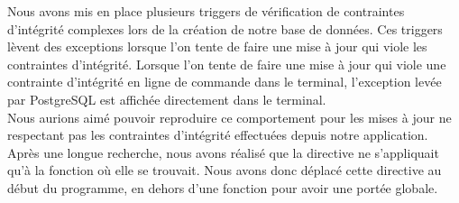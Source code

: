 Nous avons mis en place plusieurs triggers de vérification de contraintes d'intégrité complexes lors de la création de notre base de données. Ces triggers lèvent des exceptions lorsque l'on tente de faire une mise à jour qui viole les contraintes d'intégrité. Lorsque l'on tente de faire une mise à jour qui viole une contrainte d'intégrité en ligne de commande dans le terminal, l'exception levée par PostgreSQL est affichée directement dans le terminal.\\

Nous aurions aimé pouvoir reproduire ce comportement pour les mises à jour ne respectant pas les contraintes d'intégrité effectuées depuis notre application. Après une longue recherche, nous avons réalisé que la directive  ne s'appliquait qu'à la fonction où elle se trouvait. Nous avons donc déplacé cette directive au début du programme, en dehors d'une fonction pour avoir une portée globale.